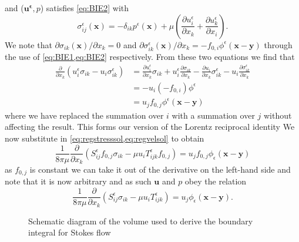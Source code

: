 and ($\bm{u^\epsilon},p$) satisfies \cref{eq:BIE2} with
\begin{equation*}
\sigma^\epsilon_{ij}(\bm{x}) = -\delta_{ik}p^\epsilon(\bm{x}) + \mu\left( \frac{\partial u^\epsilon_i}{\partial x_k} + \frac{\partial u^\epsilon_k}{\partial x_i} \right).
\end{equation*}
We note that $\partial \sigma_{ik}(\bm{x})/ \partial x_k = 0$ and $\partial \sigma^\epsilon_{ik}(\bm{x})/ \partial x_k = -f_{0,i}\phi^\epsilon(\bm{x}-\bm{y})$ through the use of \cref{eq:BIE1,eq:BIE2} respectively. From these two equations we find that
\begin{equation*}
\begin{aligned}
  \frac{\partial}{\partial x_k}(u^\epsilon_i\sigma_{ik} - u_i\sigma^\epsilon_{ik}) &=
  \frac{\partial u^\epsilon_i}{\partial x_k} \sigma_{ik} + u^\epsilon_i\frac{\partial \sigma_{ik}}{\partial x_k} - \frac{\partial u_i}{\partial x_k} \sigma^\epsilon_{ik} - u_i\frac{\partial \sigma^\epsilon_{ik}}{\partial x_k}  \\
  & = - u_i(-f_{0,i})\phi^\epsilon  \\
  &= u_j f_{0,j}\phi^\epsilon(\bm{x}-\bm{y})
\end{aligned}
\end{equation*}
where we have replaced the summation over $i$ with a summation over $j$ without affecting the result. This forms our version of the Lorentz reciprocal identity
We now substitute in \cref{eq:regstresssol,eq:regvelsol} to obtain
\begin{equation*}
  \frac{1}{8\pi\mu}\frac{\partial}{\partial x_k}(S^\epsilon_{ij}f_{0,j}\sigma_{ik} - \mu u_i T^\epsilon_{ijk}f_{0,j}) = u_j f_{0,j}\phi_\epsilon(\bm{x}-\bm{y})
\end{equation*}
as $f_{0,j}$ is constant we can take it out of the derivative on the left-hand side and note that it is now arbitrary and as such $\bm{u}$ and $p$ obey the relation
\begin{equation}
  \label{eq:reciprocalrelation}
  \frac{1}{8\pi\mu}\frac{\partial}{\partial x_k}(S^\epsilon_{ij}\sigma_{ik} - \mu u_i T^\epsilon_{ijk}) = u_j\phi_\epsilon(\bm{x}-\bm{y}).
\end{equation}

\begin{figure}[ht]
    \centering
    \resizebox{.3\linewidth}{!}{}
    \caption{Schematic diagram of the volume used to derive the boundary integral for Stokes flow}
    \label{fig:SystematicDiagram}
\end{figure}


